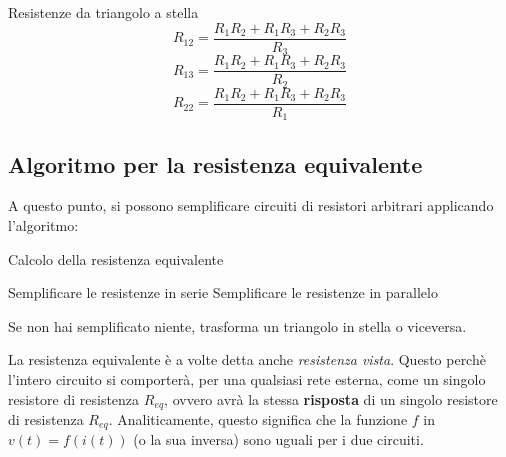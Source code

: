 \documentclass[a4paper,11pt]{article}
\begin{document}
\begin{theorem}{Resistenze da triangolo a stella}	
$$
R_{12} = \frac{R_1R_2 + R_1R_3 + R_2R_3}{R_3}
$$
$$
R_{13} = \frac{R_1R_2 + R_1R_3 + R_2R_3}{R_2}
$$
$$
R_{22} = \frac{R_1R_2 + R_1R_3 + R_2R_3}{R_1}
$$
\end{theorem}

\subsection{Algoritmo per la resistenza equivalente}
A questo punto, si possono semplificare circuiti di resistori arbitrari applicando l'algoritmo:
\begin{algorithm}
\caption{Calcolo della resistenza equivalente}
\begin{algorithmic}

	\STATE Semplificare le resistenze in serie
	\STATE Semplificare le resistenze in parallelo
	
	\STATE Se non hai semplificato niente, trasforma un triangolo in stella o viceversa.

	\ENDWHILE
\end{algorithmic}
\end{algorithm}

La resistenza equivalente è a volte detta anche \textit{resistenza vista}. 
Questo perchè l'intero circuito si comporterà, per una qualsiasi rete esterna, come un singolo resistore di resistenza $R_{eq}$, ovvero avrà la stessa \textbf{risposta} di un singolo resistore di resistenza $R_{eq}$.
Analiticamente, questo significa che la funzione $f$ in $v(t) = f(i(t))$ (o la sua inversa) sono uguali per i due circuiti.
\end{document}
